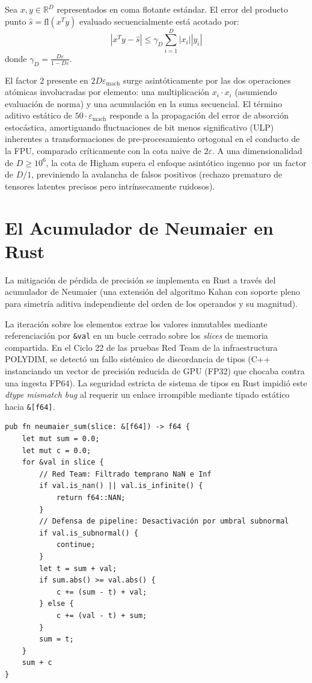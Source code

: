 \begin{theorem}
Sea $x, y \in \mathbb{R}^D$ representados en coma flotante estándar. El error del producto punto $\widehat{s} = \text{fl}(x^T y)$ evaluado secuencialmente está acotado por:
\begin{equation}
| x^T y - \widehat{s} | \le \gamma_D \sum_{i=1}^D |x_i||y_i|
\end{equation}
donde $\gamma_D = \frac{D \varepsilon}{1 - D \varepsilon}$.
\end{theorem}

El factor $2$ presente en $2D\varepsilon_{\text{mach}}$ surge asintóticamente por las dos operaciones atómicas involucradas por elemento: una multiplicación $x_i \cdot x_i$ (asumiendo evaluación de norma) y una acumulación en la suma secuencial. El término aditivo estático de $50 \cdot \varepsilon_{\text{mach}}$ responde a la propagación del error de absorción estocástica, amortiguando fluctuaciones de bit menos significativo (ULP) inherentes a transformaciones de pre-procesamiento ortogonal en el conducto de la FPU, comparado críticamente con la cota naive de $2\varepsilon$. A una dimensionalidad de $D \ge 10^6$, la cota de Higham supera el enfoque asintótico ingenuo por un factor de $D/1$, previniendo la avalancha de falsos positivos (rechazo prematuro de tensores latentes precisos pero intrínsecamente ruidosos).

\section{El Acumulador de Neumaier en Rust}

La mitigación de pérdida de precisión se implementa en Rust a través del acumulador de Neumaier (una extensión del algoritmo Kahan con soporte pleno para simetría aditiva independiente del orden de los operandos y su magnitud).

La iteración sobre los elementos extrae los valores inmutables mediante referenciación por \texttt{\&val} en un bucle cerrado sobre los \textit{slices} de memoria compartida. En el Ciclo 22 de las pruebas Red Team de la infraestructura POLYDIM, se detectó un fallo sistémico de discordancia de tipos (C++ instanciando un vector de precisión reducida de GPU (FP32) que chocaba contra una ingesta FP64). La seguridad estricta de sistema de tipos en Rust impidió este \textit{dtype mismatch bug} al requerir un enlace irrompible mediante tipado estático hacia \texttt{\&[f64]}.

\begin{verbatim}
pub fn neumaier_sum(slice: &[f64]) -> f64 {
    let mut sum = 0.0;
    let mut c = 0.0;
    for &val in slice {
        // Red Team: Filtrado temprano NaN e Inf
        if val.is_nan() || val.is_infinite() {
            return f64::NAN;
        }
        // Defensa de pipeline: Desactivación por umbral subnormal
        if val.is_subnormal() {
            continue; 
        }
        let t = sum + val;
        if sum.abs() >= val.abs() {
            c += (sum - t) + val;
        } else {
            c += (val - t) + sum;
        }
        sum = t;
    }
    sum + c
}
\end{verbatim}

